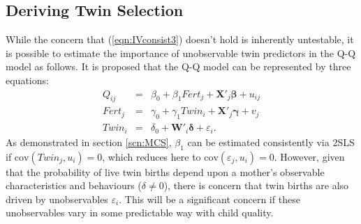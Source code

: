 \documentclass{article}[11pt,subeqn]
\newcommand{\vect}[1]{\mathbf{#1}}
\begin{document}
\begin{spacing}{1.5}
\section{Deriving Twin Selection}
\label{scn:TSAppend}
While the concern that (\ref{eqn:IVconsist3}) doesn't hold is inherently untestable, it is possible to estimate
the importance of unobservable twin predictors in the Q-Q model as follows.  It is proposed that the Q-Q model 
can be represented by three equations:
\begin{subequations}
\label{eqn:Sderiv}
\begin{eqnarray}
\label{eqn:QQ}
Q_{ij}&=&\beta_0+\beta_1Fert_j+\vect{X}'_j\vect{\beta}+u_{ij} \label{eqn:Sderiva}\\
Fert_{j}&=&\gamma_0+\gamma_1Twin_{i}+\vect{X}'_j\vect{\gamma}+v_{j} \label{eqn:Sderivb} \\
Twin_i&=&\delta_0+\vect{W}'_i\vect{\delta}+\varepsilon_i. \label{eqn:Sderivc}
 \end{eqnarray}
\end{subequations}
As demonstrated in section \ref{scn:MCS}, $\beta_1$ can be estimated consistently via 2SLS if $\text{cov}(Twin_j, u_i)=0$,
which reduces here to $\text{cov}(\varepsilon_j, u_i)=0$.  However, given that the probability of live twin births depend 
upon a mother's observable characteristics and behaviours ($\delta\neq 0$), there is concern that twin births are also 
driven by unobservables $\varepsilon_i$.  This will be a significant concern if these unobservables vary in some predictable
way with child quality.


\end{spacing}
\end{document}
